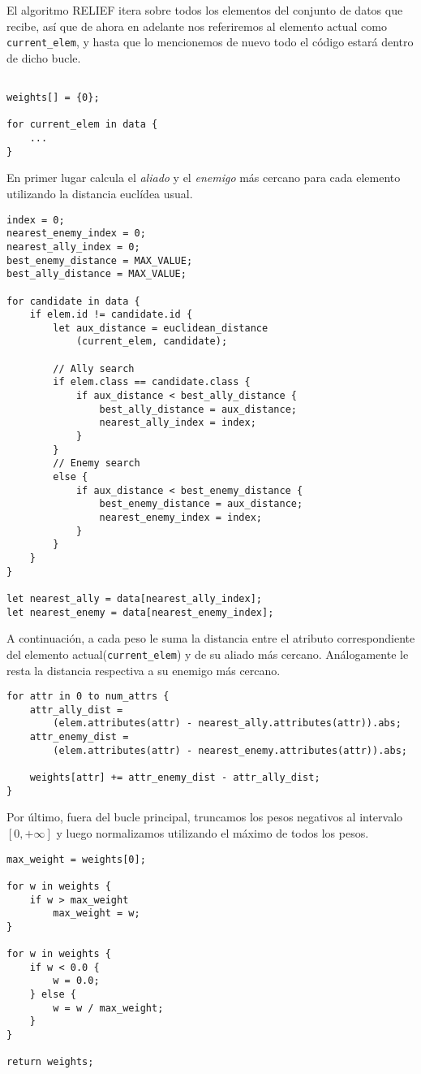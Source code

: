 \documentclass[size=a4, parskip=half, titlepage=false, toc=flat, toc=bib, 12pt]{scrartcl}
\begin{document}
El algoritmo RELIEF itera sobre todos los elementos del conjunto de datos que recibe, así que de ahora en adelante nos referiremos al elemento actual como \texttt{current\_elem}, y hasta que lo mencionemos de nuevo todo el código estará dentro de dicho bucle.
\begin{verbatim}

weights[] = {0};

for current_elem in data {
    ...
}
\end{verbatim}

En primer lugar calcula el \textit{aliado} y el \textit{enemigo} más cercano para cada elemento utilizando la distancia euclídea usual.
\begin{verbatim}
index = 0;
nearest_enemy_index = 0;
nearest_ally_index = 0;
best_enemy_distance = MAX_VALUE;
best_ally_distance = MAX_VALUE;

for candidate in data {
    if elem.id != candidate.id {
        let aux_distance = euclidean_distance
            (current_elem, candidate);

        // Ally search
        if elem.class == candidate.class {
            if aux_distance < best_ally_distance {
                best_ally_distance = aux_distance;
                nearest_ally_index = index;
            }
        }
        // Enemy search
        else {
            if aux_distance < best_enemy_distance {
                best_enemy_distance = aux_distance;
                nearest_enemy_index = index;
            }
        }
    }
}

let nearest_ally = data[nearest_ally_index];
let nearest_enemy = data[nearest_enemy_index];
\end{verbatim}

A continuación, a cada peso le suma la distancia entre el atributo correspondiente del elemento actual(\texttt{current\_elem}) y de su aliado más cercano. Análogamente le resta la distancia respectiva a su enemigo más cercano.

\begin{verbatim}
for attr in 0 to num_attrs {
    attr_ally_dist =
        (elem.attributes(attr) - nearest_ally.attributes(attr)).abs;
    attr_enemy_dist =
        (elem.attributes(attr) - nearest_enemy.attributes(attr)).abs;

    weights[attr] += attr_enemy_dist - attr_ally_dist;
}
\end{verbatim}

Por último, fuera del bucle principal, truncamos los pesos negativos al intervalo $[0,+\infty]$ y luego normalizamos utilizando el máximo de todos los pesos.
\begin{verbatim}
max_weight = weights[0];

for w in weights {
    if w > max_weight
        max_weight = w;
}

for w in weights {
    if w < 0.0 {
        w = 0.0;
    } else {
        w = w / max_weight;
    }
}

return weights;
\end{verbatim}
\end{document}
